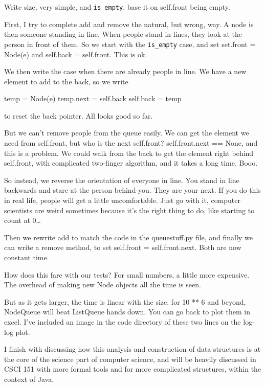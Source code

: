 \documentclass{article}
\begin{document}
Write size, very simple,  and \verb|is_empty|, base it on self.front being empty.

First, I try to complete add and remove the natural, but wrong, way. A node
is then someone standing in line. When people stand in lines, they look at
the person in front of them. So we start with the \verb|is_empty| case, and set
set.front = Node(e) and self.back = self.front. This is ok.

We then write the case when there are already people in line. We have a new
element to add to the back, so we write

temp = Node(e)
temp.next = self.back
self.back = temp

to reset the back pointer. All looks good so far.

But we can't remove people from the queue easily. We can get the element we
need from self.front, but who is the next self.front? self.front.next ==
None, and this is a problem. We could walk from the back to get the element
right behind self.front, with complicated two-finger algorithm, and it
takes a long time. Booo.

So instead, we reverse the orientation of everyone in line. You stand in
line backwards and stare at the person behind you. They are your next. If
you do this in real life, people will get a little uncomfortable. Just go
with it, computer scientists are weird sometimes because it's the right
thing to do, like starting to count at 0…

Then we rewrite add to match the code in the queuestuff.py file, and
finally we can write a remove method, to set self.front = self.front.next.
Both are now constant time.

How does this fare with our tests? For small numbers, a little more
expensive. The overhead of making new Node objects all the time is seen.

But as it gets larger, the time is linear with the size. for 10 ** 6 and
beyond, NodeQueue will beat ListQueue hands down. You can go back to plot
them in excel.  I've included an image in the code directory of these two
lines on the log-log plot.

I finish with discussing how this analysis and construction of data
structures is at the core of the science part of computer science, and will
be heavily discussed in CSCI 151 with more formal tools and for more
complicated structures, within the context of Java.
\end{document}
